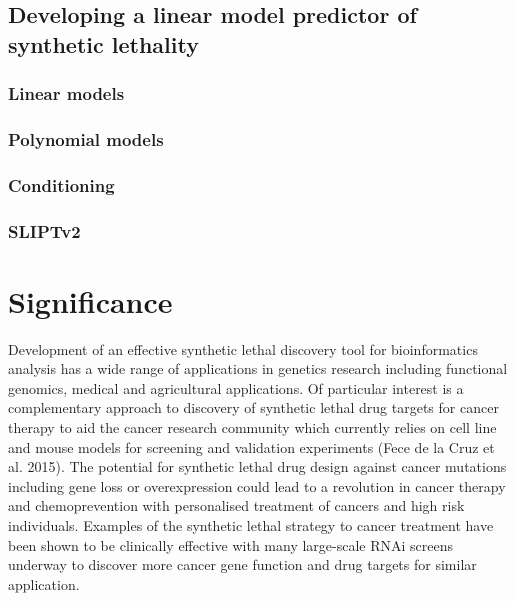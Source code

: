 \subsection{Developing a linear model predictor of synthetic lethality}
\subsubsection{Linear models}
\subsubsection{Polynomial models}
\subsubsection{Conditioning}
\subsubsection{SLIPTv2}

\section{Significance}

Development of an effective synthetic lethal discovery tool for bioinformatics analysis has a wide range of applications in genetics research including functional genomics, medical and agricultural applications.   Of particular interest is a complementary approach to discovery of synthetic lethal drug targets for cancer therapy to aid the cancer research community which currently relies on cell line and mouse models for screening and validation experiments (Fece de la Cruz et al. 2015).  The potential for synthetic lethal drug design against cancer mutations including gene loss or overexpression could lead to a revolution in cancer therapy and chemoprevention with personalised treatment of cancers and high risk individuals.  Examples of the synthetic lethal strategy to cancer treatment have been shown to be clinically effective with many large-scale RNAi screens underway to discover more cancer gene function and drug targets for similar application.

